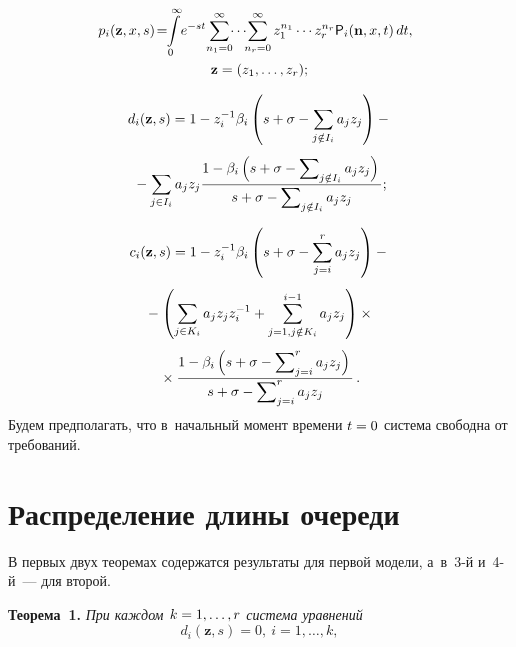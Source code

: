 \begin{multicols}{2}
\vspace*{-12pt}

\begin{multline*}
\hspace*{-2mm}p_i(\mathbf{z},x,s)\!=\!\!\int\limits_0^{\infty}\!e^{-st}\!\sum\limits_{n_1=0}^{\infty}\!\!\cdots\!\!\sum\limits_{n_r=0}^{\infty}
z_1^{n_1}\cdots z_r^{n_r}{\sf P}_i(\mathbf{n},x,t)\,dt,\\ 
\mathbf{z}=(z_1,\ldots,z_r);
\end{multline*}

\vspace*{-12pt}

\begin{multline*}
d_i(\mathbf{z},s)=1-z_i^{-1}\beta_i\left(s+\sigma-\sum\limits_{j\notin I_i}a_jz_j\right)-{}\\[4pt]
{}- \sum\limits_{j\in I_i}a_j z_j \displaystyle\frac{\displaystyle 1-\beta_i\left(s+\sigma-\sum\nolimits_{j\notin I_i}a_jz_j\right)\mathstrut}{\displaystyle s+\sigma-\sum\nolimits_{j\notin I_i}a_jz_j\mathstrut};
\end{multline*}

\vspace*{-12pt}

\begin{multline*}
c_i(\mathbf{z},s)=1-z_i^{-1}\beta_i\left(s+\sigma-\sum\limits_{j=i}^ra_jz_j\right)-{}\\[4pt]
{}-\left(
\sum\limits_{j\in K_i}a_jz_jz_i^{-1}+\sum\limits_{j=1, j\notin K_i}^{i-1}a_jz_j\right)\times{}\\[4pt]
{}\times
\displaystyle\frac{\displaystyle 1-\beta_i\left(s+\sigma-\sum\nolimits_{j=i}^ra_jz_j\right)\mathstrut}{\displaystyle s+\sigma-\sum\nolimits_{j=i}^ra_jz_j\mathstrut}\,.
\end{multline*}
Будем предполагать, что в~начальный момент времени $t\hm=0$ сис\-те\-ма свободна от требований.

\vspace*{-9pt}

\section{Распределение длины очереди}

\vspace*{-3pt}

В первых двух теоремах содержатся результаты для первой модели, а~в~3-й и~4-й~--- для второй.

\smallskip

\noindent
\textbf{Теорема~1.} \textit{При каждом $k\hm=1,\ldots,r$ сис\-те\-ма урав\-нений}
$$
d_i(\mathbf{z},s)=0,\ i=1,\ldots,k,
$$


\end{multicols}

